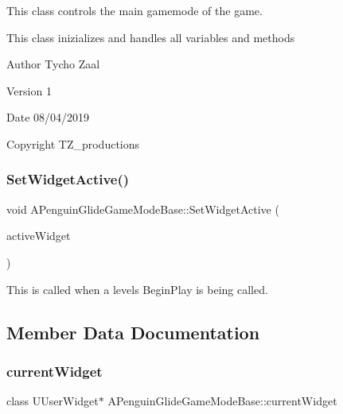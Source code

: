 This class controls the main gamemode of the game. 

This class inizializes and handles all variables and methods \begin{DoxyAuthor}{Author}
Tycho Zaal 
\end{DoxyAuthor}
\begin{DoxyVersion}{Version}
1 
\end{DoxyVersion}
\begin{DoxyDate}{Date}
08/04/2019 
\end{DoxyDate}
\begin{DoxyCopyright}{Copyright}
T\+Z\+\_\+productions 
\end{DoxyCopyright}
\mbox{\label{class_a_penguin_glide_game_mode_base_ae81f88494076351c5d18b08a8854242f}} 
\subsubsection{SetWidgetActive()}
{\footnotesize\ttfamily void A\+Penguin\+Glide\+Game\+Mode\+Base\+::\+Set\+Widget\+Active (\begin{DoxyParamCaption}\item[{T\+Subclass\+Of$<$ class U\+User\+Widget $>$}]{active\+Widget }\end{DoxyParamCaption})\hspace{0.3cm}{\ttfamily [protected]}}



This is called when a level\textquotesingle{}s Begin\+Play is being called. 



\subsection{Member Data Documentation}
\mbox{\label{class_a_penguin_glide_game_mode_base_a0b95180b6f41e7dd4f83b50ea3cffaa3}} 
\subsubsection{currentWidget}
{\footnotesize\ttfamily class U\+User\+Widget$\ast$ A\+Penguin\+Glide\+Game\+Mode\+Base\+::current\+Widget\hspace{0.3cm}{\ttfamily [protected]}}


